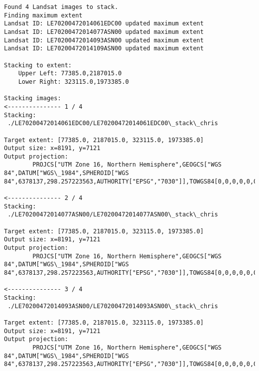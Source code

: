\documentclass{article}
\begin{document}
    \begin{Verbatim}[commandchars=\\\{\}]
Found 4 Landsat images to stack.
Finding maximum extent
Landsat ID: LE70200472014061EDC00 updated maximum extent
Landsat ID: LE70200472014077ASN00 updated maximum extent
Landsat ID: LE70200472014093ASN00 updated maximum extent
Landsat ID: LE70200472014109ASN00 updated maximum extent

Stacking to extent:
	Upper Left: 77385.0,2187015.0
	Lower Right: 323115.0,1973385.0

Stacking images:
<--------------- 1 / 4 
Stacking:
 ./LE70200472014061EDC00/LE70200472014061EDC00\_stack\_chris

Target extent: [77385.0, 2187015.0, 323115.0, 1973385.0]
Output size: x=8191, y=7121
Output projection: 
 		PROJCS["UTM Zone 16, Northern Hemisphere",GEOGCS["WGS 84",DATUM["WGS\_1984",SPHEROID["WGS 84",6378137,298.257223563,AUTHORITY["EPSG","7030"]],TOWGS84[0,0,0,0,0,0,0],AUTHORITY["EPSG","6326"]],PRIMEM["Greenwich",0,AUTHORITY["EPSG","8901"]],UNIT["degree",0.0174532925199433,AUTHORITY["EPSG","9108"]],AUTHORITY["EPSG","4326"]],PROJECTION["Transverse\_Mercator"],PARAMETER["latitude\_of\_origin",0],PARAMETER["central\_meridian",-87],PARAMETER["scale\_factor",0.9996],PARAMETER["false\_easting",500000],PARAMETER["false\_northing",0],UNIT["Meter",1]]

<--------------- 2 / 4 
Stacking:
 ./LE70200472014077ASN00/LE70200472014077ASN00\_stack\_chris

Target extent: [77385.0, 2187015.0, 323115.0, 1973385.0]
Output size: x=8191, y=7121
Output projection: 
 		PROJCS["UTM Zone 16, Northern Hemisphere",GEOGCS["WGS 84",DATUM["WGS\_1984",SPHEROID["WGS 84",6378137,298.257223563,AUTHORITY["EPSG","7030"]],TOWGS84[0,0,0,0,0,0,0],AUTHORITY["EPSG","6326"]],PRIMEM["Greenwich",0,AUTHORITY["EPSG","8901"]],UNIT["degree",0.0174532925199433,AUTHORITY["EPSG","9108"]],AUTHORITY["EPSG","4326"]],PROJECTION["Transverse\_Mercator"],PARAMETER["latitude\_of\_origin",0],PARAMETER["central\_meridian",-87],PARAMETER["scale\_factor",0.9996],PARAMETER["false\_easting",500000],PARAMETER["false\_northing",0],UNIT["Meter",1]]

<--------------- 3 / 4 
Stacking:
 ./LE70200472014093ASN00/LE70200472014093ASN00\_stack\_chris

Target extent: [77385.0, 2187015.0, 323115.0, 1973385.0]
Output size: x=8191, y=7121
Output projection: 
 		PROJCS["UTM Zone 16, Northern Hemisphere",GEOGCS["WGS 84",DATUM["WGS\_1984",SPHEROID["WGS 84",6378137,298.257223563,AUTHORITY["EPSG","7030"]],TOWGS84[0,0,0,0,0,0,0],AUTHORITY["EPSG","6326"]],PRIMEM["Greenwich",0,AUTHORITY["EPSG","8901"]],UNIT["degree",0.0174532925199433,AUTHORITY["EPSG","9108"]],AUTHORITY["EPSG","4326"]],PROJECTION["Transverse\_Mercator"],PARAMETER["latitude\_of\_origin",0],PARAMETER["central\_meridian",-87],PARAMETER["scale\_factor",0.9996],PARAMETER["false\_easting",500000],PARAMETER["false\_northing",0],UNIT["Meter",1]]


\end{Verbatim}
\end{document}
